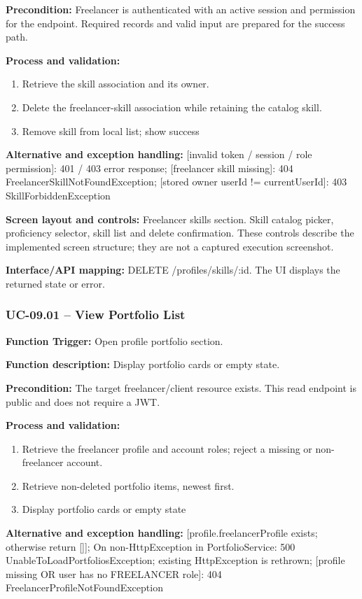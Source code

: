 \textbf{Precondition:} Freelancer is authenticated with an active session and permission for the endpoint. Required records and valid input are prepared for the success path.

\textbf{Process and validation:}
\begin{enumerate}
\item Retrieve the skill association and its owner.
\item Delete the freelancer-skill association while retaining the catalog skill.
\item Remove skill from local list; show success
\end{enumerate}
\textbf{Alternative and exception handling:} [invalid token /\allowbreak{} session /\allowbreak{} role permission]: 401 /\allowbreak{} 403 error response; [freelancer skill missing]: 404 Freelancer\allowbreak{}Skill\allowbreak{}Not\allowbreak{}Found\allowbreak{}Exception; [stored owner user\allowbreak{}Id !=\allowbreak{} current\allowbreak{}User\allowbreak{}Id]: 403 Skill\allowbreak{}Forbidden\allowbreak{}Exception

\textbf{Screen layout and controls:} Freelancer skills section. Skill catalog picker, proficiency selector, skill list and delete confirmation. These controls describe the implemented screen structure; they are not a captured execution screenshot.

\textbf{Interface/\allowbreak{}API mapping:} DELETE /\allowbreak{}profiles/\allowbreak{}skills/\allowbreak{}:id. The UI displays the returned state or error.

\subsubsection{UC-09.01 -- View Portfolio List}
\textbf{Function Trigger:} Open profile portfolio section.

\textbf{Function description:} Display portfolio cards or empty state.

\textbf{Precondition:} The target freelancer/\allowbreak{}client resource exists. This read endpoint is public and does not require a JWT.

\textbf{Process and validation:}
\begin{enumerate}
\item Retrieve the freelancer profile and account roles; reject a missing or non-freelancer account.
\item Retrieve non-deleted portfolio items, newest first.
\item Display portfolio cards or empty state
\end{enumerate}
\textbf{Alternative and exception handling:} [profile.freelancer\allowbreak{}Profile exists; otherwise return []]; On non-Http\allowbreak{}Exception in Portfolio\allowbreak{}Service: 500 Unable\allowbreak{}To\allowbreak{}Load\allowbreak{}Portfolios\allowbreak{}Exception; existing Http\allowbreak{}Exception is rethrown; [profile missing OR user has no FREELANCER role]: 404 Freelancer\allowbreak{}Profile\allowbreak{}Not\allowbreak{}Found\allowbreak{}Exception

